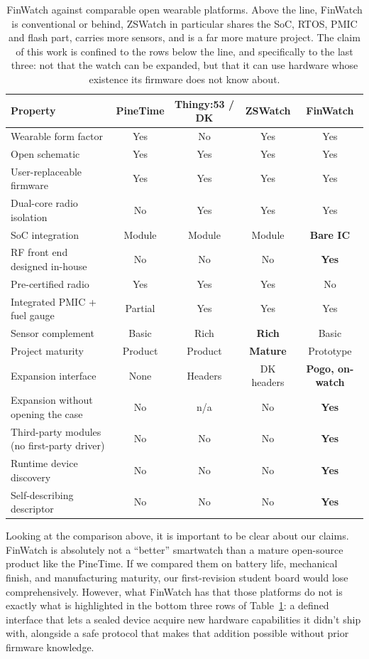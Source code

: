 \documentclass[12pt, a4paper]{article}
\begin{document}
\begin{table}[H]
\centering
\small
\begin{tabular}{@{}l c c c c@{}}
\toprule
\textbf{Property} & \textbf{PineTime} & \textbf{Thingy:53 / DK} & \textbf{ZSWatch} & \textbf{FinWatch} \\
\midrule
Wearable form factor        & Yes & No & Yes & Yes \\
Open schematic              & Yes & Yes & Yes & Yes \\
User-replaceable firmware   & Yes & Yes & Yes & Yes \\
Dual-core radio isolation   & No & Yes & Yes & Yes \\
SoC integration             & Module & Module & Module & \textbf{Bare IC} \\
RF front end designed in-house & No & No & No & \textbf{Yes} \\
Pre-certified radio         & Yes & Yes & Yes & No \\
Integrated PMIC + fuel gauge & Partial & Yes & Yes & Yes \\
Sensor complement           & Basic & Rich & \textbf{Rich} & Basic \\
Project maturity            & Product & Product & \textbf{Mature} & Prototype \\
\midrule
Expansion interface         & None & Headers & DK headers & \textbf{Pogo, on-watch} \\
Expansion without opening the case & No & n/a & No & \textbf{Yes} \\
Third-party modules (no first-party driver) & No & No & No & \textbf{Yes} \\
Runtime device discovery    & No  & No  & No & \textbf{Yes} \\
Self-describing descriptor  & No  & No  & No & \textbf{Yes} \\
\bottomrule
\end{tabular}
\caption{FinWatch against comparable open wearable platforms. Above the line, FinWatch is conventional or behind, ZSWatch in particular shares the SoC, RTOS, PMIC and flash part, carries more sensors, and is a far more mature project. The claim of this work is confined to the rows below the line, and specifically to the last three: not that the watch can be expanded, but that it can use hardware whose existence its firmware does not know about.}
\label{tab:compare}
\end{table}

Looking at the comparison above, it is important to be clear about our claims. FinWatch is absolutely not a ``better'' smartwatch than a mature open-source product like the PineTime. If we compared them on battery life, mechanical finish, and manufacturing maturity, our first-revision student board would lose comprehensively. However, what FinWatch has that those platforms do not is exactly what is highlighted in the bottom three rows of Table~\ref{tab:compare}: a defined interface that lets a sealed device acquire new hardware capabilities it didn't ship with, alongside a safe protocol that makes that addition possible without prior firmware knowledge.
\end{document}
